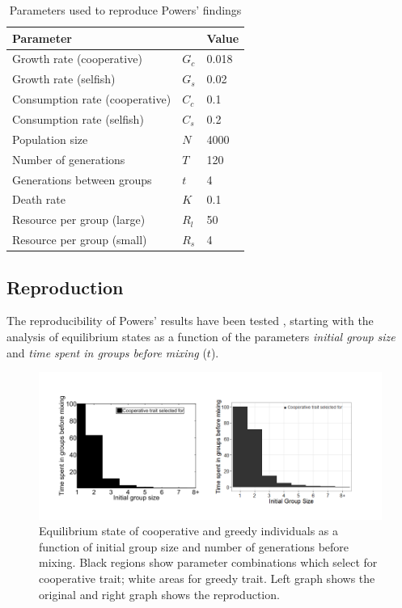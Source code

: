 \documentclass[a4paper,10pt, twocolumn]{article}
\begin{document}
\begin{table}
\begin{tabular}{|l l |l|}
\hline
\textbf{Parameter} & & \textbf{Value} \\
\hline 
Growth rate (cooperative) & $G_c$ & 0.018 \\ \hline
Growth rate (selfish) & $G_s$ & 0.02 \\ \hline
Consumption rate (cooperative) & $C_c$ & 0.1 \\ \hline
Consumption rate (selfish) & $C_s$ & 0.2 \\ \hline
Population size & $N$ & 4000 \\ \hline
Number of generations & $T$ & 120 \\ \hline
Generations between groups & $t$ & 4 \\ \hline
Death rate & $K$ & 0.1 \\ \hline
Resource per group (large) & $R_l$ & 50 \\ \hline
Resource per group (small) & $R_s$ & 4 \\ \hline
\end{tabular}
\caption{Parameters used to reproduce Powers' findings \cite{Paper}}
\label{table:parametersReproduction}
\end{table}

\subsection{Reproduction}
The reproducibility of Powers' results have been tested \cite{Paper}, starting with the analysis of equilibrium states as a function of the parameters \textit{initial group size} and \textit{time spent in groups before mixing} ($t$).
 
\begin{figure}[ht]
	\includegraphics[width=\linewidth]{Figure1.png}
	\centering
	\caption{Equilibrium state of cooperative and greedy individuals as a function of initial group size and number of generations before mixing. Black regions show parameter combinations which select for cooperative trait; white areas for greedy trait. Left graph shows the original \cite{Paper} and right graph shows the reproduction.}
		\label{fig:Figure1}
\end{figure}
\end{document}
